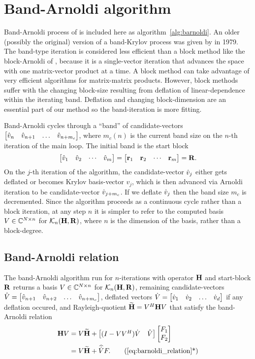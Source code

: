 \section{Band-Arnoldi algorithm}
 Band-Arnoldi process of \cite{AN} is included here as algorithm~\ref{alg:barnoldi}.   An older (possibly the original) version of a band-Krylov process was given by \cite{ruhe1979bLanczos} in 1979. The band-type iteration is considered less efficient than a  block method like the block-Arnoldi of  \cite{lehoucq1997block}, because it is a single-vector iteration that advances the space with one matrix-vector product at a time.  A block method can take advantage of very efficient algorithms for matrix-matrix products.    However, block methods suffer with the changing block-size resulting from deflation of linear-dependence within the iterating band.  Deflation and changing block-dimension are an essential part of our method so the band-iteration is more fitting.          

Band-Arnoldi cycles through a ``band'' of candidate-vectors  $\begin{bmatrix} \hat{v}_n&\hat{v}_{n+1} &\ldots&\hat{v}_{n+ m_c}\end{bmatrix}$, where $m_c(n)$ is the current band size on the $n$-th iteration of the main loop. The initial band  is the start block
\[
\begin{bmatrix} \hat{v}_1&\hat{v}_2&\cdots&\hat{v}_m\end{bmatrix} = \begin{bmatrix} \textbf{\textup{r}}_1&\textbf{\textup{r}}_2&\cdots&\textbf{\textup{r}}_m\end{bmatrix} = \textbf{\textup{R}}.
\]
 On the $j$-th iteration of the algorithm, the candidate-vector $\hat{v}_j$ either gets deflated or becomes Krylov basis-vector $v_j$, which is then advanced via Arnoldi iteration to be candidate-vector $\hat{v}_{j+m_c}$.  If  we deflate  $\hat{v}_j$  then the band size $m_c$ is decremented.   Since the algorithm proceeds as a continuous cycle rather than a block iteration, at any step $n$  it is simpler to refer to the computed basis $V\in\mathbb{C}^{N\times n}$ for $\mathcal{K}_{n}({\textbf{\textup{H}}},{\textbf{\textup{R}}})$, where $n$ is the dimension of the basis, rather than a block-degree.  

\subsection{Band-Arnoldi relation}
The band-Arnoldi algorithm run for $n$-iterations with operator $\textbf{\textup{H}}$ and start-block $\textbf{\textup{R}}$ returns a basis $V\in\mathbb{C}^{N\times n}$ for    $\mathcal{K}_{n}({\textbf{\textup{H}}},{\textbf{\textup{R}}})$,  remaining candidate-vectors $\hat{V}=\begin{bmatrix} \hat{v}_{n+1}&\hat{v}_{n+2} &\ldots&\hat{v}_{n+m_c}\end{bmatrix}$, deflated vectors $\dot{V}=\begin{bmatrix} \dot{v}_1&\dot{v}_2&\ldots&\dot{v}_d\end{bmatrix}$ if any deflation occured, and Rayleigh-quotient $\widetilde{\textbf{\textup{H}}}=V^H\textbf{\textup{H}} V$ that satisfy the band-Arnoldi relation 
\begin{align}
\H V  &= V \Himp + \mat{(I-V\c{V}) \Vd  &  \Vh} \mat{F_1\\F_2} \label{eq:barnoldi_relation} \\
&=   V \Himp + \Vdh F. \tag{\ref{eq:barnoldi_relation}*}
\end{align}

